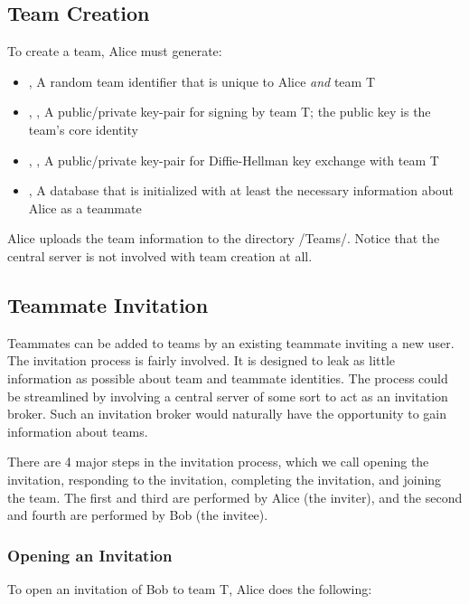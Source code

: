 \documentclass[pldi,10pt,preprint]{sigplanconf-pldi16}
\begin{document}
\subsection{Team Creation}

To create a team, Alice must generate:

\begin{itemize}
\item {}, A random team identifier that is unique to Alice \emph{and} team T
\item {}, , A public/private key-pair for signing by team T; the public key is the team's core identity
\item {}, , A public/private key-pair for Diffie-Hellman key exchange with team T
\item {}, A database that is initialized with at least the necessary information about Alice as a teammate
\end{itemize}

Alice uploads the team information to the directory \slash Teams\slash {}.
Notice that the central server is not involved with team creation at all.

\subsection{Teammate Invitation}

Teammates can be added to teams by an existing teammate inviting a new user.
The invitation process is fairly involved.
It is designed to leak as little information as possible about team and teammate identities.
The process could be streamlined by involving a central server of some sort to act as an invitation broker.
Such an invitation broker would naturally have the opportunity to gain information about teams.

There are 4 major steps in the invitation process, which we call opening the invitation, responding to the invitation, completing the invitation, and joining the team.
The first and third are performed by Alice (the inviter), and the second and fourth are performed by Bob (the invitee).

\subsubsection{Opening an Invitation}

To open an invitation of Bob to team T, Alice does the following:
\end{document}
